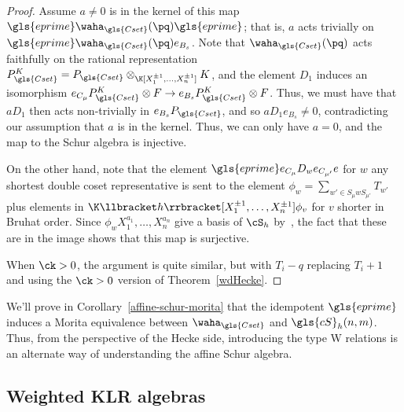 \begin{proof}
Assume $a\neq 0$ is in the kernel of this map 
$\gls{eprime} \waha_{\gls{Cset}}(\pq) \gls{eprime}$; that is, $a$ acts trivially on $\gls{eprime}
\waha_{\gls{Cset}}(\pq) e_{B_s}$. Note that
$\waha_{\gls{Cset}}(\pq)$ acts faithfully on the rational representation
$P^K_{\gls{Cset}}=P_{\gls{Cset}}\otimes_{\K[X_1^{\pm 1},\dots,X_n^{\pm 1}]}K$, and the element $D_1$ induces an isomorphism $
e_{C_{\mu} }P_{\gls{Cset}}^K\otimes F\to e_{B_s }P_{\gls{Cset}}^K\otimes
F$. Thus, we must have that $aD_1$ then acts non-trivially in $ e_{B_s }P_{\gls{Cset}}$, and so $aD_1e_{B_s }\neq 0$, contradicting our assumption that
$a$ is in the kernel.
Thus, we can only have $a=0$, and the map to the Schur algebra is injective.

On the other hand, note that the element $\gls{eprime}e_{C_\mu}D_we_{C_{\mu'}}e$
for $w$ any shortest double coset representative is sent to the element
$\phi_w=\sum_{w'\in S_{\mu}w S_{\mu'}}T_{w'}$ plus elements in
$\K\llbracket h\rrbracket [X^{\pm 1}_1,\dots, X^{\pm 1}_n]\phi_v$ for $v$ shorter in Bruhat
order. Since $\phi_w X^{a_1}_1,\dots, X^{a_n}_n$ give a basis of
$\cS_h$ by~\cite[2.2.2]{GreenSchur}, the fact that these are in the image shows that this map is
surjective.

When $\ck >0$, the argument is quite similar, but with $T_i-q$
replacing $T_i+1$ and using the $\ck>0$ version of Theorem~\ref{wdHecke}.
\end{proof}
We'll prove in Corollary~\ref{affine-schur-morita} that the idempotent
$\gls{eprime}$ induces a Morita equivalence between $\waha_{\gls{Cset}}$ and $\gls{cS}_h(n,m)$.
Thus, from the perspective of the Hecke side, introducing the type W
relations is an alternate way of understanding the affine Schur
algebra.

\subsection{Weighted KLR algebras}
\label{sec:weight-klr-algebr}


